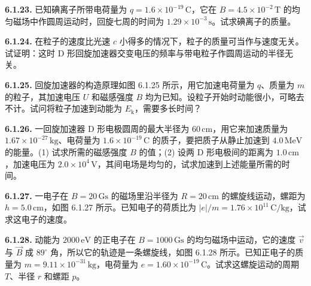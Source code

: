 \begin{center}
\end{center}

\vfill
\newpage

\textbf{6.1.23.} 已知碘离子所带电荷量为 $q = 1.6 \times 10^{-19}\,\mathrm{C}$，它在 $B = 4.5 \times 10^{-2}\,\mathrm{T}$ 的均匀磁场中作圆周运动时，回旋七周的时间为 $1.29 \times 10^{-3}\,\mathrm{s}$。试求碘离子的质量。

\vfill
\newpage

\textbf{6.1.24.} 在粒子的速度比光速 $c$ 小得多的情况下，粒子的质量可当作与速度无关。试证明：这时 D 形回旋加速器交变电压的频率与带电粒子作圆周运动的半径无关。

\vfill
\newpage

\textbf{6.1.25.} 回旋加速器的构造原理如图 6.1.25 所示，用它加速电荷量为 $q$、质量为 $m$ 的粒子，其加速电压 $U$ 和磁感强度 $B$ 均为已知。设粒子开始时动能很小，可略去不计。试问将粒子加速到动能为 $E_{\mathrm{k}}$，需要多长时间？

\begin{center}
\end{center}

\vfill
\newpage

\textbf{6.1.26.} 一回旋加速器 D 形电极圆周的最大半径为 $60\,\mathrm{cm}$，用它来加速质量为 $1.67 \times 10^{-27}\,\mathrm{kg}$、电荷量为 $1.6 \times 10^{-19}\,\mathrm{C}$ 的质子，要把质子从静止加速到 $4.0\,\mathrm{MeV}$ 的能量。(1) 试求所需的磁感强度 $B$ 的值；(2) 设两 D 形电极间的距离为 $1.0\,\mathrm{cm}$，加速电压为 $2.0 \times 10^{4}\,\mathrm{V}$，其间电场是均匀的，试求加速到上述能量所需的时间。

\vfill
\newpage

\textbf{6.1.27.} 一电子在 $B = 20\,\mathrm{Gs}$ 的磁场里沿半径为 $R = 20\,\mathrm{cm}$ 的螺旋线运动，螺距为 $h = 5.0\,\mathrm{cm}$，如图 6.1.27 所示。已知电子的荷质比为 $\lvert e \rvert / m = 1.76 \times 10^{11}\,\mathrm{C/kg}$，试求这电子的速度。

\begin{center}
\end{center}

\vfill
\newpage

\textbf{6.1.28.} 动能为 $2000\,\mathrm{eV}$ 的正电子在 $B = 1000\,\mathrm{Gs}$ 的均匀磁场中运动，它的速度 $\vec{v}$ 与 $\vec{B}$ 成 $89^{\circ}$ 角，所以它的轨迹是一条螺旋线，如图 6.1.28 所示。已知正电子的质量为 $m = 9.11 \times 10^{-31}\,\mathrm{kg}$，电荷量为 $e = 1.60 \times 10^{-19}\,\mathrm{C}$。试求这螺旋运动的周期 $T$、半径 $r$ 和螺距 $p$。

